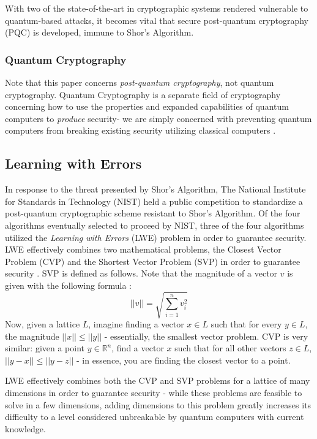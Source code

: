 \documentclass[a4paper]{article}
\begin{document}
With two of the state-of-the-art in cryptographic systems rendered
vulnerable to quantum-based attacks, it becomes vital that secure
post-quantum cryptography (PQC) is developed, immune to Shor's
Algorithm.

\subsubsection[quantumcryptography]{Quantum Cryptography}
Note that this paper concerns
\emph{post-quantum cryptography}, not quantum cryptography. Quantum
Cryptography is a separate field of cryptography concerning how to use
the properties and expanded capabilities of quantum computers to
\emph{produce} security- we are simply concerned with preventing quantum
computers from breaking existing security utilizing classical computers
\autocite{gisinQuantumCryptography2002}.

\subsection{Learning with Errors}\label{learning-with-errors}

In response to the threat presented by Shor's Algorithm, The National
Institute for Standards in Technology (NIST) held a public competition
to standardize a post-quantum cryptographic scheme resistant to Shor's
Algorithm. Of the four algorithms eventually selected to proceed by
NIST, three of the four algorithms utilized the \emph{Learning with
Errors} (LWE) problem in order to guarantee security. LWE effectively
combines two mathematical problems, the Closest Vector Problem (CVP) and
the Shortest Vector Problem (SVP) in order to guarantee security
\autocite{blanco-chaconRingLearningErrors2019}. SVP is defined as follows.
Note that the magnitude of a vector \(v\) is given with the following
formula \autocite{schneierAppliedCryptographyProtocols1996}:
\[ || v || = \sqrt{\sum_{i = 1}^n v^2_i}\] Now, given a lattice \(L\),
imagine finding a vector \(x \in L\) such that for every \(y \in L\),
the magnitude \(||x|| \leq ||y||\) - essentially, the smallest vector
problem. CVP is very similar: given a point \(y \in \mathbb{R}^n\), find
a vector \(x\) such that for all other vectors \(z \in L\),
\(|| y - x || \leq || y - z||\) - in essence, you are finding the
closest vector to a point.

LWE effectively combines both the CVP and SVP problems for a lattice of
many dimensions in order to guarantee security - while these problems
are feasible to solve in a few dimensions, adding dimensions to this
problem greatly increases its difficulty to a level considered
unbreakable by quantum computers with current knowledge.
\end{document}

